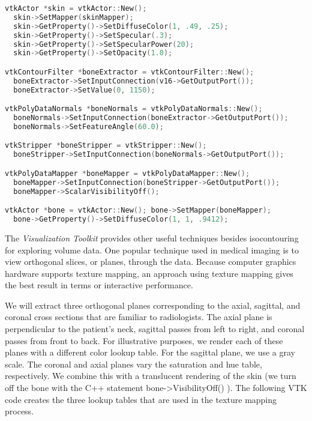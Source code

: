 \begin{lstlisting}[language=C++, caption={Improving the visualizarion of the isosurface.}]
vtkActor *skin = vtkActor::New();
  skin->SetMapper(skinMapper);
  skin->GetProperty()->SetDiffuseColor(1, .49, .25);
  skin->GetProperty()->SetSpecular(.3);
  skin->GetProperty()->SetSpecularPower(20);
  skin->GetProperty()->SetOpacity(1.0);

vtkContourFilter *boneExtractor = vtkContourFilter::New();
  boneExtractor->SetInputConnection(v16->GetOutputPort());
  boneExtractor->SetValue(0, 1150);

vtkPolyDataNormals *boneNormals = vtkPolyDataNormals::New();
  boneNormals->SetInputConnection(boneExtractor->GetOutputPort());
  boneNormals->SetFeatureAngle(60.0);

vtkStripper *boneStripper = vtkStripper::New();
  boneStripper->SetInputConnection(boneNormals->GetOutputPort());

vtkPolyDataMapper *boneMapper = vtkPolyDataMapper::New();
  boneMapper->SetInputConnection(boneStripper->GetOutputPort());
  boneMapper->ScalarVisibilityOff();

vtkActor *bone = vtkActor::New(); bone->SetMapper(boneMapper);
  bone->GetProperty()->SetDiffuseColor(1, 1, .9412);
\end{lstlisting}

The \emph{Visualization Toolkit} provides other useful techniques besides isocontouring for exploring volume data. One popular technique used in medical imaging is to view orthogonal slices, or planes, through the data. Because computer graphics hardware supports texture mapping, an approach using texture mapping gives the best result in terms or interactive performance.

We will extract three orthogonal planes corresponding to the axial, sagittal, and coronal cross sections that are familiar to radiologists. The axial plane is perpendicular to the patient's neck, sagittal passes from left to right, and coronal passes from front to back. For illustrative purposes, we render each of these planes with a different color lookup table. For the sagittal plane, we use a gray scale. The coronal and axial planes vary the saturation and hue table, respectively. We combine this with a translucent rendering of the skin (we turn off the bone with the C++ statement bone->VisibilityOff() ). The following VTK code creates the three lookup tables that are used in the texture mapping process.

